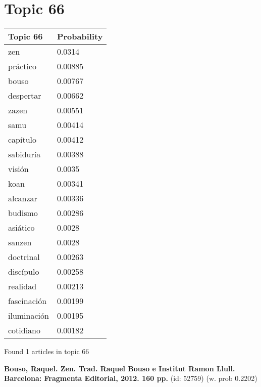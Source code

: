 \documentclass{article}
\begin{document}
\section*{Topic 66}\vfill
\begin{tabular}{ll}
\toprule
    Topic 66 & Probability \\
\midrule
         zen &      0.0314 \\
    práctico &     0.00885 \\
       bouso &     0.00767 \\
   despertar &     0.00662 \\
       zazen &     0.00551 \\
        samu &     0.00414 \\
    capítulo &     0.00412 \\
   sabiduría &     0.00388 \\
      visión &      0.0035 \\
        koan &     0.00341 \\
    alcanzar &     0.00336 \\
     budismo &     0.00286 \\
    asiático &      0.0028 \\
      sanzen &      0.0028 \\
   doctrinal &     0.00263 \\
   discípulo &     0.00258 \\
    realidad &     0.00213 \\
 fascinación &     0.00199 \\
 iluminación &     0.00195 \\
   cotidiano &     0.00182 \\
\bottomrule
\end{tabular}

\vfill
Found 1 articles in topic 66
\vfill

\textbf{Bouso, Raquel. Zen. Trad. Raquel Bouso e Institut Ramon Llull. Barcelona: Fragmenta Editorial, 2012. 160 pp.} (id: 52759)
 (w. prob 0.2202)

\vfill
\newpage


\centering
\thispagestyle{empty}
\end{document}
